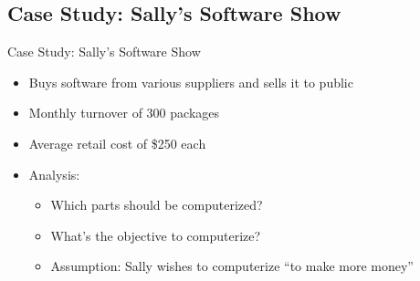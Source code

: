 \documentclass{beamer}
\begin{document}
	\subsection{Case Study: Sally's Software Show}
	\begin{frame}{Case Study: Sally's Software Show}
		\begin{itemize}
			\item Buys software from various suppliers and sells it to public
			\item Monthly turnover of 300 packages
			\item Average retail cost of \$250 each
			\item Analysis:
			\begin{itemize}
				\item Which parts should be computerized?
				\item What's the objective to computerize?
				\item Assumption: Sally wishes to computerize ``to make more money''
			\end{itemize}
		\end{itemize}
	\end{frame}
\end{document}

